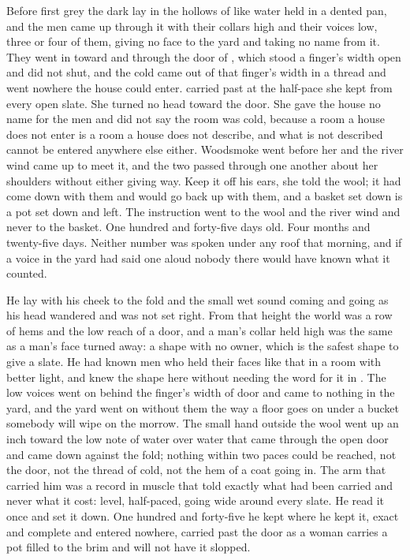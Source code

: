 
Before first grey the dark lay in the hollows of  like water held in a dented pan, and the men came up through it with their collars high and their voices low, three or four of them, giving no face to the yard and taking no name from it. They went in toward  and through the door of , which stood a finger's width open and did not shut, and the cold came out of that finger's width in a thread and went nowhere the house could enter.  carried  past at the half-pace she kept from every open slate. She turned no head toward the door. She gave the house no name for the men and did not say the room was cold, because a room a house does not enter is a room a house does not describe, and what is not described cannot be entered anywhere else either. Woodsmoke went before her and the river wind came up to meet it, and the two passed through one another about her shoulders without either giving way. Keep it off his ears, she told the wool; it had come down with them and would go back up with them, and a basket set down is a pot set down and left. The instruction went to the wool and the river wind and never to the basket. One hundred and forty-five days old. Four months and twenty-five days. Neither number was spoken under any roof that morning, and if a voice in the yard had said one aloud nobody there would have known what it counted.

He lay with his cheek to the fold and the small wet sound coming and going as his head wandered and was not set right. From that height the world was a row of hems and the low reach of a door, and a man's collar held high was the same as a man's face turned away: a shape with no owner, which is the safest shape to give a slate. He had known men who held their faces like that in a room with better light, and knew the shape here without needing the word for it in . The low voices went on behind the finger's width of door and came to nothing in the yard, and the yard went on without them the way a floor goes on under a bucket somebody will wipe on the morrow. The small hand outside the wool went up an inch toward the low note of water over water that came through the open door and came down against the fold; nothing within two paces could be reached, not the door, not the thread of cold, not the hem of a coat going in. The arm that carried him was a record in muscle that told exactly what had been carried and never what it cost: level, half-paced, going wide around every slate. He read it once and set it down. One hundred and forty-five he kept where he kept it, exact and complete and entered nowhere, carried past the door as a woman carries a pot filled to the brim and will not have it slopped.

